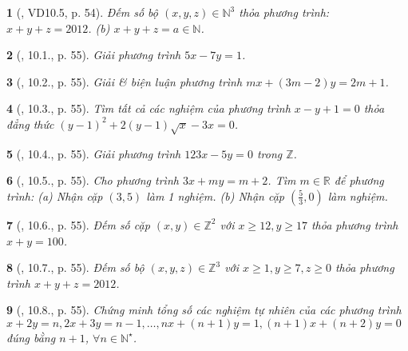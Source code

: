\documentclass{article}
\newtheorem{baitoan}{}
\begin{document}
\begin{baitoan}[\cite{TLCT_THCS_Toan_9_dai_so}, VD10.5, p. 54]
	Đếm số bộ $(x,y,z)\in\mathbb{N}^3$ thỏa phương trình: $x + y + z = 2012$. (b) $x + y + z = a\in\mathbb{N}$.
\end{baitoan}

\begin{baitoan}[\cite{TLCT_THCS_Toan_9_dai_so}, 10.1., p. 55]
	Giải phương trình $5x - 7y = 1$.
\end{baitoan}

\begin{baitoan}[\cite{TLCT_THCS_Toan_9_dai_so}, 10.2., p. 55]
	Giải \& biện luận phương trình $mx + (3m - 2)y = 2m + 1$.
\end{baitoan}

\begin{baitoan}[\cite{TLCT_THCS_Toan_9_dai_so}, 10.3., p. 55]
	Tìm tất cả các nghiệm của phương trình $x - y + 1 = 0$ thỏa đẳng thức $(y - 1)^2 + 2(y - 1)\sqrt{x} - 3x = 0$.
\end{baitoan}

\begin{baitoan}[\cite{TLCT_THCS_Toan_9_dai_so}, 10.4., p. 55]
	Giải phương trình $123x - 5y = 0$ trong $\mathbb{Z}$.
\end{baitoan}

\begin{baitoan}[\cite{TLCT_THCS_Toan_9_dai_so}, 10.5., p. 55]
	Cho phương trình $3x + my = m + 2$. Tìm $m\in\mathbb{R}$ để phương trình: (a) Nhận cặp $(3,5)$ làm 1 nghiệm. (b) Nhận cặp $\left(\frac{5}{3},0\right)$ làm nghiệm.
\end{baitoan}

\begin{baitoan}[\cite{TLCT_THCS_Toan_9_dai_so}, 10.6., p. 55]
	Đếm số cặp $(x,y)\in\mathbb{Z}^2$ với $x\ge12,y\ge17$ thỏa phương trình $x + y = 100$.
\end{baitoan}

\begin{baitoan}[\cite{TLCT_THCS_Toan_9_dai_so}, 10.7., p. 55]
	Đếm số bộ $(x,y,z)\in\mathbb{Z}^3$ với $x\ge1,y\ge7,z\ge0$ thỏa phương trình $x + y + z = 2012$.
\end{baitoan}

\begin{baitoan}[\cite{TLCT_THCS_Toan_9_dai_so}, 10.8., p. 55]
	Chứng minh tổng số các nghiệm tự nhiên của các phương trình $x + 2y = n,2x + 3y = n - 1,\ldots,nx + (n + 1)y = 1,(n + 1)x + (n + 2)y = 0$ đúng bằng $n + 1$, $\forall n\in\mathbb{N}^\star$.
\end{baitoan}
\end{document}
